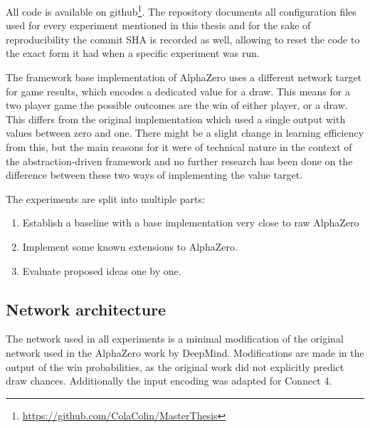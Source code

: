 \documentclass[12pt,onecolumn,oneside,titlepage]{article}
\begin{document}
All code is available on github\footnote{\url{https://github.com/ColaColin/MasterThesis}}. The repository documents all configuration files used for every experiment mentioned in this thesis and 
for the sake of reproducibility the commit SHA is recorded as well, allowing to reset the code to the exact form it had when a specific experiment was run.

The framework base implementation of AlphaZero uses a different network target for game results, which encodes a dedicated value for a draw. This means for a two player game the possible outcomes are the win of either player, or a draw.
This differs from the original implementation which used a single output with values between zero and one.
There might be a slight change in learning efficiency from this, but the main reasons for it were of technical nature in the context of the abstraction-driven framework and no further research has been done on the difference between these two ways of implementing the value target.

The experiments are split into multiple parts:
\begin{enumerate}
 \item Establish a baseline with a base implementation very close to raw AlphaZero
 \item Implement some known extensions to AlphaZero.
 \item Evaluate proposed ideas one by one.
\end{enumerate}

\subsection{Network architecture}

The network used in all experiments is a minimal modification of the original network used in the AlphaZero work by DeepMind. Modifications are made in the output of the win probabilities, as the original work did not explicitly predict draw chances. Additionally the 
input encoding was adapted for Connect 4.
\end{document}
